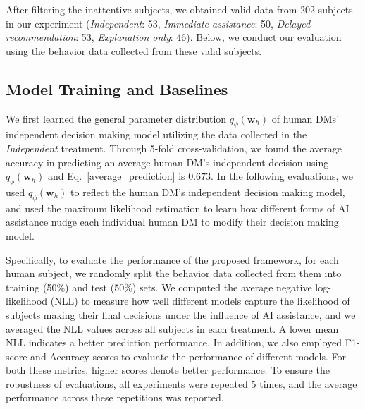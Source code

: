 \documentclass[letterpaper]{article} %
\newcommand{\my}[1]{\textcolor{blue}{[Ming: #1]}}
\newcommand{\zy}[1]{\textcolor{red}{[Zhuoyan: #1]}}
\begin{document}
After filtering the inattentive subjects, we obtained valid data from 202 subjects in our experiment (\emph{Independent}: 53, \emph{Immediate assistance}: 50, \emph{Delayed recommendation}: 53, \emph{Explanation only}: 46). Below, we conduct our evaluation using the behavior data collected from these valid subjects.
\subsection{Model Training and Baselines}
We first learned the general parameter distribution $q_{\phi}(\bm{w}_h)$ of human DMs' independent decision making model
utilizing the data collected in the \emph{Independent} treatment. Through 5-fold cross-validation, we found the average accuracy in predicting an average human DM's independent decision
using $q_{\phi}(\bm{w}_h)$ and Eq.~\ref{average_prediction}  is $0.673$. In the following evaluations, we used $q_{\phi}(\bm{w}_h)$ to reflect the human DM's independent decision making model, and used the maximum likelihood estimation to learn how different forms of AI assistance nudge each individual human DM to modify their decision making model. 


Specifically, to evaluate the performance of the proposed framework, for each human subject, we randomly split the behavior data collected from them into training 
(50\%) and test (50\%) sets. We computed the average negative log-likelihood (NLL) to measure how well different models capture the likelihood of subjects making their final decisions under the influence of AI assistance,  
and we averaged the NLL values across all subjects in each treatment. A lower mean NLL indicates a better prediction performance. In addition, we also employed F1-score and Accuracy scores to evaluate the performance of different models. For both these metrics, higher scores denote better performance. To ensure the robustness of evaluations, all experiments were repeated 5 times, and the average performance across these repetitions was reported. 
\end{document}
